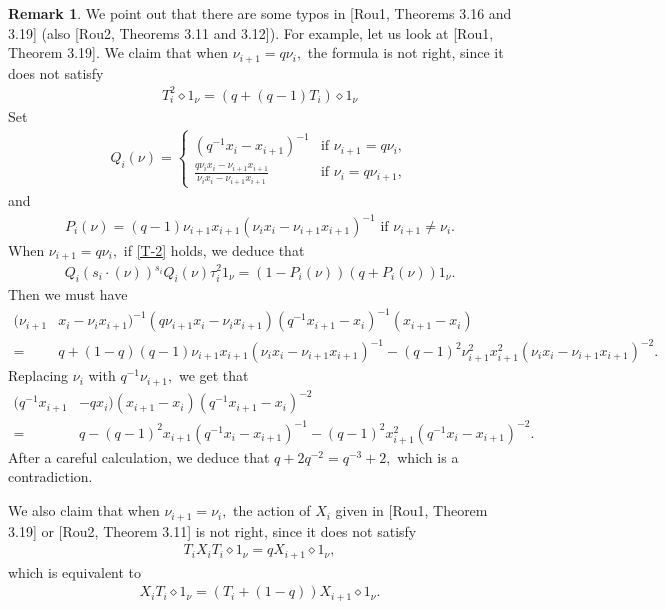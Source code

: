 \documentclass[11pt, reqno]{amsart} \textwidth=14.9cm \oddsidemargin=1cm \evensidemargin=1cm
\theoremstyle{definition}
\newtheorem{remark}[theorem]{Remark}
\numberwithin{equation}{section}
\begin{document}
\begin{remark}\label{Typos}
We point out that there are some typos in [Rou1, Theorems 3.16 and 3.19] (also [Rou2, Theorems 3.11 and 3.12]). For example, let us look at [Rou1, Theorem 3.19]. We claim that when $\nu_{i+1}=q\nu_{i},$ the formula is not right, since it does not satisfy
\begin{align}\label{T-2}
T_{i}^{2}\diamond 1_{\nu}=(q+(q-1)T_{i})\diamond 1_{\nu}
\end{align}
Set
\begin{align*}
Q_{i}(\nu)=
\begin{cases}
(q^{-1}x_{i}-x_{i+1})^{-1} & \text{if } \nu_{i+1}=q\nu_{i},
\\
\frac{q\nu_{i}x_{i}-\nu_{i+1}x_{i+1}}{\nu_{i}x_{i}-\nu_{i+1}x_{i+1}}
 & \text{if } \nu_{i}=q\nu_{i+1},
\end{cases}
\end{align*}
and
\begin{align*}
P_{i}(\nu)=(q-1)\nu_{i+1}x_{i+1}(\nu_{i}x_{i}-\nu_{i+1}x_{i+1})^{-1}\text{ if } \nu_{i+1}\neq \nu_{i}.
\end{align*}
When $\nu_{i+1}=q\nu_{i},$ if \eqref{T-2} holds, we deduce that
\begin{align*}
Q_{i}(s_{i}\cdot(\nu)){}^{s_{i}}Q_{i}(\nu)\tau_{i}^{2}1_{\nu}=(1-P_{i}(\nu))(q+P_{i}(\nu))1_{\nu}.
\end{align*}
Then we must have
\begin{align*}
(\nu_{i+1}&x_{i}-\nu_{i}x_{i+1})^{-1}(q\nu_{i+1}x_{i}-\nu_{i}x_{i+1})(q^{-1}x_{i+1}-x_{i})^{-1}(x_{i+1}-x_{i})\\
=&q+(1-q)(q-1)\nu_{i+1}x_{i+1}(\nu_{i}x_{i}-\nu_{i+1}x_{i+1})^{-1}-(q-1)^{2}\nu_{i+1}^{2}x_{i+1}^{2}(\nu_{i}x_{i}-\nu_{i+1}x_{i+1})^{-2}.
\end{align*}
Replacing $\nu_{i}$ with $q^{-1}\nu_{i+1},$ we get that
\begin{align*}
(q^{-1}x_{i+1}&-qx_{i})(x_{i+1}-x_{i})(q^{-1}x_{i+1}-x_{i})^{-2}\\
=&q-(q-1)^{2}x_{i+1}(q^{-1}x_{i}-x_{i+1})^{-1}-(q-1)^{2}x_{i+1}^{2}(q^{-1}x_{i}-x_{i+1})^{-2}.
\end{align*}
After a careful calculation, we deduce that $q+2q^{-2}=q^{-3}+2,$ which is a contradiction.

We also claim that when $\nu_{i+1}=\nu_{i},$ the action of $X_{i}$ given in [Rou1, Theorem 3.19] or [Rou2, Theorem 3.11] is not right, since it does not satisfy
\begin{align*}
T_{i}X_{i}T_{i}\diamond 1_{\nu}=qX_{i+1}\diamond 1_{\nu},
\end{align*}
which is equivalent to
\begin{align}\label{T-X-T}
X_{i}T_{i}\diamond 1_{\nu}=(T_{i}+(1-q))X_{i+1}\diamond 1_{\nu}.
\end{align}


\end{remark}
\end{document}
